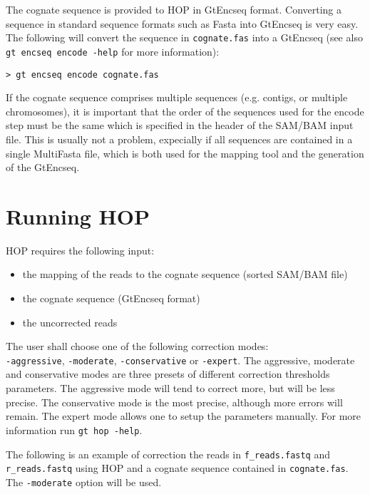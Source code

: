 \documentclass[12pt,titlepage]{article}
\newcommand{\Hop}{{HOP}\xspace}
\begin{document}
The cognate sequence is provided to \Hop in GtEncseq format. Converting
a sequence in standard sequence formats such as Fasta into GtEncseq is very
easy. The following will convert the sequence in \texttt{cognate.fas}
into a GtEncseq (see also \texttt{gt encseq encode -help} for more information):

\begin{footnotesize}
\begin{verbatim}
> gt encseq encode cognate.fas
\end{verbatim}
\end{footnotesize}

If the cognate sequence comprises multiple sequences (e.g. contigs,
or multiple chromosomes), it is important that the order of the sequences
used for the encode step must be the same which is specified in the header
of the SAM/BAM input file. This is usually not a problem, expecially
if all sequences are contained in a single MultiFasta file,
which is both used for the mapping tool and the generation of the GtEncseq.

\section{Running \Hop}

\Hop requires the following input:
\begin{itemize}
\item the mapping of the reads to the cognate sequence (sorted SAM/BAM file)
\item the cognate sequence (GtEncseq format)
\item the uncorrected reads
\end{itemize}

The user shall choose one of the following correction modes:\\
\texttt{-aggressive},
\texttt{-moderate},
\texttt{-conservative} or
\texttt{-expert}.
The aggressive, moderate and conservative modes are three presets
of different correction thresholds parameters. The aggressive mode
will tend to correct more, but will be less precise. The conservative
mode is the most precise, although more errors will remain.
The expert mode allows one to setup the parameters manually. For more
information run \texttt{gt hop -help}.

The following is an example of correction the reads in
\texttt{f\_reads.fastq} and \texttt{r\_reads.fastq} using \Hop
and a cognate sequence contained in \texttt{cognate.fas}.
The \texttt{-moderate} option will be used.
\end{document}
